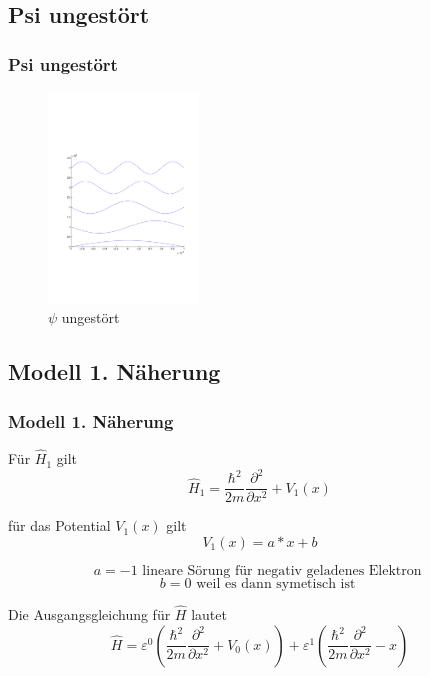 \documentclass[aspectratio=169]{beamer}
\begin{document}
\subsection{ Psi ungest\"ort }
\begin{frame}
  \frametitle{ Psi ungest\"ort }
  \begin{figure}
    \centering
    \includegraphics[height=5.6cm,clip=true,trim=2cm 7cm 1cm 8cm]{../../skript/efeld/Psi_ungestoert.pdf}
    \caption{$\psi$ ungest\"ort}
    \label{abb:efeld_psi_ungestoert}
  \end{figure}

\end{frame}

\subsection{ Modell 1. N\"aherung }
\begin{frame} 
  \frametitle{ Modell 1. N\"aherung }

  F\"ur $\hat H_1$ gilt
  \[
    \hat H_1 = \frac{\hbar^2}{2m} \frac{\partial^2}{\partial x^2} + V_1(x)
  \]

  f\"ur das Potential $V_1(x)$ gilt
  \[
    V_1(x) = a*x +b 
  \]
  
  \[
  a = -1 \text{ lineare S\"orung f\"ur negativ geladenes Elektron }
  \]
  \[
  b = 0 \text{ weil es dann symetisch ist }
  \]

  Die Ausgangsgleichung f\"ur $\hat{H}$ lautet
  \[
    \hat{H} = \varepsilon^0 ( \frac{\hbar^2}{2m} \frac{\partial^2}{\partial x^2} + V_0(x) )
               + \varepsilon^1 ( \frac{\hbar^2}{2m} \frac{\partial^2}{\partial x^2} - x )
  \]
\end{frame}
\end{document}
